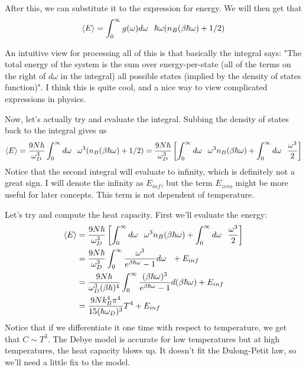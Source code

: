 \documentclass[12pt]{article}
\begin{document}
\vspace{0.25 in}

After this, we can substitute it to the expression for energy. We will then get that
\begin{equation*}
    \langle E\rangle=\int_0^\infty g(\omega)d\omega\hspace{0.1in} \hbar\omega(n_B(\beta\hbar\omega)+1/2)
\end{equation*}

An intuitive view for processing all of this is that  basically the integral says: "The total energy of the system is the sum over energy-per-state (all of the terms on the right of $d\omega$ in the integral) all possible states (implied by the density of states function)". I think this is quite cool, and a nice way to view complicated expressions in physics. 

\vspace{0.25 in}

Now, let's actually try and evaluate the integral. Subbing the density of states back to the integral gives us
\begin{equation*}
    \langle E\rangle=\frac{9N\hbar}{\omega_D^3}\int_0^\infty d\omega\hspace{0.1in} \omega^3(n_B(\beta\hbar\omega)+1/2)=\frac{9N\hbar}{\omega_D^3}\left[\int_0^\infty d\omega\hspace{0.1in} \omega^3n_B(\beta\hbar\omega)+\int_0^\infty d\omega\hspace{0.1in} \frac{\omega^3}{2}\right]
\end{equation*}
Notice that the second integral will evaluate to infinity, which is definitely not a great sign. I will denote the infinity as $E_{inf}$, but the term $E_{zero}$ might be more useful for later concepts. This term is not dependent of temperature.
\vspace{0.25 in}

Let's try and compute the heat capacity. First we'll evaluate the energy:
\begin{align*}
    \langle E\rangle&=\frac{9N\hbar}{\omega_D^3}\left[\int_0^\infty d\omega\hspace{0.1in} \omega^3n_B(\beta\hbar\omega)+\int_0^\infty d\omega\hspace{0.1in} \frac{\omega^3}{2}\right]\\
    &=\frac{9N\hbar}{\omega_D^3}\int_0^\infty\frac{\omega^3}{e^{\beta\hbar\omega}-1} d\omega\hspace{0.1 in}+E_{inf}\\
    &=\frac{9N\hbar}{\omega_D^3(\beta\hbar)^4}\int_0^\infty \frac{(\beta\hbar\omega)^3}{e^{\beta\hbar\omega}-1}d(\beta\hbar\omega) + E_{inf} \\
    &=\frac{9Nk_B^4\pi^4}{15(\hbar\omega_D)^3}T^4 + E_{inf}
\end{align*}
Notice that if we differentiate it one time with respect to temperature, we get that $C\sim T^3$. The Debye model is accurate for low temperatures but at high temperatures, the heat capacity blows up. It doesn't fit the Dulong-Petit law, so we'll need a little fix to the model.
\end{document}

